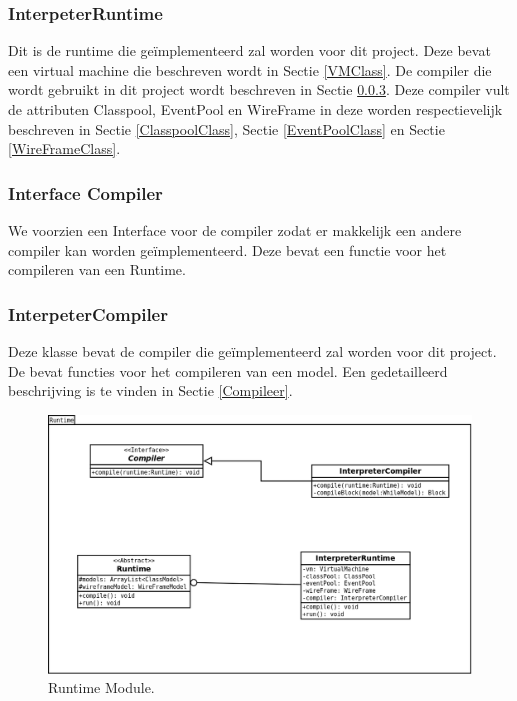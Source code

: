 \documentclass[]{article}
\begin{document}
\subsubsection{InterpeterRuntime}
\label{runtimeClass}
Dit is de runtime die ge\"{i}mplementeerd zal worden voor dit project. Deze bevat een virtual machine die beschreven wordt in Sectie \ref{VMClass}. De compiler die wordt gebruikt in dit project wordt beschreven in Sectie \ref{IntCompClass}. Deze compiler vult de attributen Classpool, EventPool en WireFrame in deze worden respectievelijk beschreven in Sectie \ref{ClasspoolClass}, Sectie \ref{EventPoolClass} en Sectie \ref{WireFrameClass}.
\subsubsection{Interface Compiler}
We voorzien een Interface voor de compiler zodat er makkelijk een andere compiler kan worden ge\"{i}mplementeerd. Deze bevat een functie voor het compileren van een Runtime.
\subsubsection{InterpeterCompiler}
\label{IntCompClass}
Deze klasse bevat de compiler die ge\"{i}mplementeerd zal worden voor dit project. De bevat functies voor het compileren van een model. Een gedetailleerd beschrijving is te vinden in Sectie \ref{Compileer}.

\clearpage
 \begin{figure}
  \centering
   
\includegraphics[scale=0.8]{./AnalyseClassenDiagram/runtime.png}
  \caption{Runtime Module.} \label{runtimeUML}
\end{figure}
\clearpage
\end{document}

